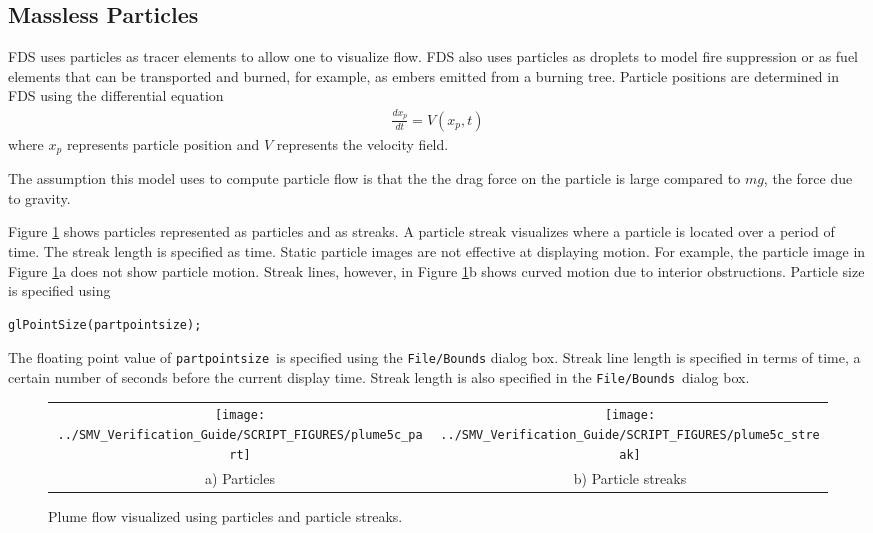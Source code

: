 \documentclass[11pt,twoside]{book}
\begin{document}
\subsection{Massless Particles}
FDS uses particles as tracer elements to allow one to visualize flow.  FDS
also uses particles as droplets to model fire suppression or as fuel elements that can be transported and burned, for example, as embers emitted from a burning tree.  Particle positions are determined in FDS using the differential equation
\begin{eqnarray}
\frac{dx_p}{dt}=V(x_p,t)
\end{eqnarray}
where $x_p$ represents particle position and $V$ represents the velocity field.

The assumption this model uses to compute particle flow is that the the drag force on the particle is large compared to $mg$, the force due to gravity.

Figure \ref{figpart}
shows particles represented as particles and
as streaks.
A particle streak visualizes where a particle is located over a period of time.  The streak length is specified as time.
Static particle images are not effective at displaying motion.  For example, the particle image in Figure \ref{figpart}a does not show particle motion.  Streak lines, however, in Figure \ref{figpart}b shows curved motion due to interior obstructions.
Particle size is
specified using
\begin{lstlisting}
glPointSize(partpointsize);
\end{lstlisting}
The floating point value of {\tt partpointsize}\ is specified using the {\tt File/Bounds}
dialog box.  Streak line length is specified in terms of time, a certain number of seconds before the current display time.  Streak length is also specified in the {\tt File/Bounds}\ dialog box.

\begin{figure}[\figoptions]
\begin{center}
\begin{tabular}{cc}
\texttt{[image: ../SMV\_Verification\_Guide/SCRIPT\_FIGURES/plume5c\_part]}&
\texttt{[image: ../SMV\_Verification\_Guide/SCRIPT\_FIGURES/plume5c\_streak]}\\
a) Particles&b) Particle streaks\\
\end{tabular}
\end{center}
\caption{Plume flow visualized using particles and particle streaks.}
\label{figpart}%
\end{figure}
\end{document}
